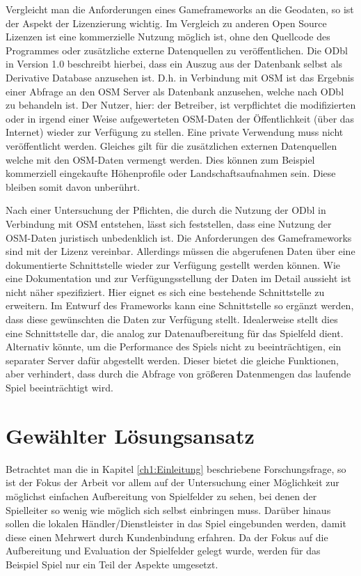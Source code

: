 Vergleicht man die Anforderungen eines Gameframeworks an die Geodaten, so ist der Aspekt der Lizenzierung wichtig. Im Vergleich zu anderen Open Source Lizenzen ist eine kommerzielle Nutzung möglich ist, ohne den Quellcode des Programmes oder zusätzliche externe Datenquellen zu veröffentlichen.
Die ODbl in Version 1.0 beschreibt hierbei, dass ein Auszug aus der Datenbank selbst als Derivative Database anzusehen ist.\cite{Odbl.2014} D.h. in Verbindung mit OSM ist das Ergebnis einer Abfrage an den OSM Server als Datenbank anzusehen, welche nach ODbl zu behandeln ist. Der Nutzer, hier: der Betreiber, ist verpflichtet die modifizierten oder in irgend einer Weise aufgewerteten OSM-Daten der Öffentlichkeit (über das Internet) wieder zur Verfügung zu stellen. Eine private Verwendung muss nicht veröffentlicht werden. Gleiches gilt für die zusätzlichen externen Datenquellen welche mit den OSM-Daten vermengt werden. Dies können zum Beispiel kommerziell eingekaufte Höhenprofile oder Landschaftsaufnahmen sein. Diese bleiben somit davon unberührt.

Nach einer Untersuchung der Pflichten, die durch die Nutzung der ODbl in Verbindung mit OSM entstehen, lässt sich feststellen, dass eine Nutzung der OSM-Daten juristisch unbedenklich ist. 
Die Anforderungen des Gameframeworks sind mit der Lizenz vereinbar.
Allerdings müssen die abgerufenen Daten über eine dokumentierte Schnittstelle wieder zur Verfügung gestellt werden können.
Wie eine Dokumentation und zur Verfügungsstellung der Daten im Detail aussieht ist nicht näher spezifiziert. Hier eignet es sich eine bestehende Schnittstelle zu erweitern. Im Entwurf des Frameworks kann eine Schnittstelle so ergänzt werden, dass diese gewünschten die Daten zur Verfügung stellt. Idealerweise stellt dies eine Schnittstelle dar, die analog zur Datenaufbereitung für das Spielfeld dient. Alternativ könnte, um die Performance des Spiels nicht zu beeinträchtigen, ein separater Server dafür abgestellt werden. Dieser bietet die gleiche Funktionen, aber verhindert, dass durch die Abfrage von größeren Datenmengen das laufende Spiel beeinträchtigt wird.

\section{Gewählter Lösungsansatz}
\label{ch4:s:choosen_solution}

Betrachtet man die in Kapitel \ref{ch1:Einleitung} beschriebene Forschungsfrage, so ist der Fokus der Arbeit vor allem auf der Untersuchung einer Möglichkeit zur möglichst einfachen Aufbereitung von Spielfelder zu sehen, bei denen der Spielleiter so wenig wie möglich sich selbst einbringen muss. Darüber hinaus sollen die lokalen Händler/Dienstleister in das Spiel eingebunden werden, damit diese einen Mehrwert durch Kundenbindung erfahren.
Da der Fokus auf die Aufbereitung und Evaluation der Spielfelder gelegt wurde, werden für das Beispiel Spiel nur ein Teil der Aspekte umgesetzt.

